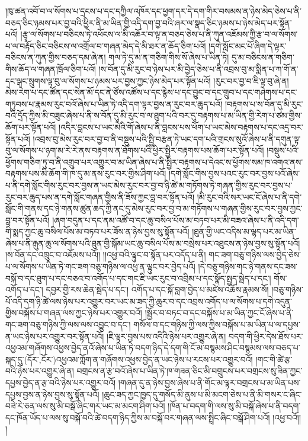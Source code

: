 །ཁུ་ཚན་འབོ་བ་ལ་སོགས་པ་དྲངས་པ་དང་དཀྱིལ་འཁོར་དང་ཕྱག་དར་དེ་དག་གིར་བསམས་ན་ཉེས་མེད་ཅེས་པ་ནི་བཅད་ཅིང་ཉམས་པར་བྱ་བའི་ཕྱིར་ནི་མ་ཡིན་གྱི་འདི་དག་བྱ་བའི་ཞར་ལ་སྣད་ཅིང་ཉམས་པ་ཉེས་མེད་པར་སྟོན་པའོ། །རྩྭ་ལ་སོགས་པ་བཅིངས་ཏེ་འཕོངས་ལ་མི་འཆོར་བ་ལྟ་ན་བཅད་ཅེས་པ་ནི་ཀུན་འཇོམས་ཀྱི་རྩ་བ་ལ་སོགས་པ་ལ་བརྟོད་ཅིང་བཅིངས་ལ་འགྲོལ་བ་གཞན་མེད་དེ་མི་ཐར་ན་ཆོད་ཅིག་པའོ། །དགེ་སློང་མང་པོ་ཞིག་དེ་ལྟར་བཅིངས་ན་ཀུན་གྱིས་བཅད་དམ་ཞེ་ན། གལ་ཏེ་དུ་མ་ན་གཅིག་གིས་སོ་ཞེས་པ་ཡིན་ཏེ། དུ་མ་བཅིངས་ན་གཅིག་གིས་ཆོད་ལ་གཞན་ཁྲོལ་ཅིག་པའོ། །ས་བོན་དུ་མི་རུང་བ་ཉེས་པར་མི་བྱེད་ཅེས་པ་ནི་འབྲས་བུ་མ་སྨིན་པ་ཀ་གོ་ན་དང་ལྒང་སྲུགས་ལྟ་བུ་ལ་སོགས་པ་ཉམས་པར་བྱས་ཀྱང་ཉེས་མེད་པར་སྟོན་པའོ། །རུང་བར་བྱ་བ་ཇི་ལྟ་བུ་ཞེ་ན། མེས་རེག་པ་དང་ཚོན་དང་སེན་མོ་དང་ནེ་ཙོས་འཚོས་པ་དང་རྙེས་པ་དང་བྱུང་བ་དང་གྲུབ་པ་དང་གཤེགས་པ་དང་གཏུབས་པ་རྣམས་རུང་བའོ་ཞེས་པ་ཡིན་ཏེ་འདི་དག་ལྟར་བྱས་ན་རུང་བར་ཆུད་པའོ། །བརྟགས་པ་ས་བོན་དུ་མི་རུང་བའི་དྲོད་ཀྱིས་མི་བཟུང་ཞེས་པ་ནི་ས་བོན་དུ་མི་རུང་བ་ལ་ཐུག་པའི་བར་དུ་བརྟགས་པ་མ་ཡིན་གྱི་རེག་པ་ཙམ་གྱིས་ཆོག་པར་སྟོན་པའོ། །འདིར་བླངས་པ་ཡང་མེའི་གོ་ཞེས་པ་ནི་བླངས་པས་ཕོག་པ་ཡང་མེས་བརྟགས་པ་དང་འདྲ་བར་སྟོན་པའོ། །འབྲས་བུ་མེས་རུང་བར་བྱ་བ་ནི་བསྡུས་པའི་སྤྱི་བརྩན་ཏེ་ཡང་དག་པའི་གྲངས་སུའོ་ཞེས་པ་ནི་དགུན་ལྟ་བུ་ལ་སོགས་པ་ཉག་མ་རེ་རེ་ནས་བརྟགས་ན་ཐོགས་པའི་ཕྱིར་སྤྱིར་བརྟགས་པས་ཆོག་པར་སྟོན་པའོ། །བསྡུས་པའི་ཕྱོགས་གཅིག་ཏུ་བ་ནི་འགྲུབ་པར་འགྱུར་བ་མ་ཡིན་ཞེས་པ་ནི་སྤྱིར་བརྟགས་པ་དེའང་ས་ཕྱོགས་སམ་ཁ་འགའ་ནས་བརྟགས་པས་མི་ཆོག་གི་ཁ་དུ་མ་ནས་རུང་བར་གྱིས་ཤིག་པའོ། །དགེ་སློང་གིས་བྱས་པའང་རུང་བར་བྱས་པའོ་ཞེས་པ་ནི་དགེ་སློང་གིས་རུང་བར་བྱས་ན་ཡང་མེས་རུང་བར་བྱ་བ་ཉི་ཚེ་མ་གཏོགས་ཏེ་གཞན་གྱིས་རུང་བར་བྱས་པ་རུང་བར་ཆུད་པས་ན་དགེ་སློང་གཞན་གྱིས་ནི་ཟོས་ཀྱང་བླ་བར་སྟོན་པའོ། །མི་རུང་བའི་སར་ཡང་ངོ་ཞེས་པ་ནི་དགེ་སློང་གི་གནས་དང་ཉེ་གནས་ཚུན་ཆད་ཀྱི་ནང་དུ་མེས་རུང་བར་བྱ་བ་མ་གཏོགས་པ་གཞན་གྱིས་རུང་བར་བྱས་ཀྱང་བླ་བར་སྟོན་པའོ། །ཞག་བདུན་པ་དང་ནམ་འཚོ་བ་དང་ཆུ་བསིལ་པོས་མ་བཏབ་པར་མི་བཟའ་ཞེས་པ་ནི་འདི་དག་གི་སྨད་ཀྱང་ཆུ་བསིལ་པོས་མ་བཏབ་པར་ཟོས་ན་ཉེས་བྱས་སུ་སྟོན་པའོ། །ཐུན་གྱི་ཡང་འདིས་མ་ལྷད་པར་མ་ཡིན་ཞེས་པ་ནི་རྒུན་ཆུ་ལ་སོགས་པའི་ཐུན་གྱི་སྐོམ་ཡང་ཆུ་བསིལ་པོས་མ་བསྲེས་པར་འཐུངས་ན་ཉེས་བྱས་སུ་སྟོན་པའོ། །ས་བོན་དང་འཁྲུང་བ་འཇོམས་པའོ།། །།འཕྱ་བའི་ལྟུང་བ་སྟོན་པར་འདོད་པ་ནི། གང་ཟག་བཅུ་གཉིས་ལས་བྱེད་ཅེས་པ་ལ་སོགས་པ་ཡིན་ཏེ་གང་ཟག་བཅུ་གཉིས་ལ་འཕྱ་ན་ལྟུང་བར་བྱེད་པའོ། །དེ་བཅུ་གཉིས་གང་ཉེ་གནས་དང་ཟས་བསྐོ་བ་དང་ཐུག་པ་དང་བཅའ་བ་འགོད་པ་དང་གང་ཇི་ཡང་རུང་བ་འབྲིམ་པ་དང་སྣོད་སྤྱད་སྦེད་པ་དང་། གོས་འགོད་པ་དང་། དབྱར་གྱི་རས་ཆེན་སྦེད་པ་དང་། འགོད་པ་དང་སྐོ་བླག་བྱེད་པ་མཛེས་འཆོས་རྣམས་སོ། །བཅུ་གཉིས་པོ་འདི་དག་ཉི་ཚེ་ལས་ཉེས་པར་འགྱུར་བར་ཡང་མ་ཟད་ཀྱི་ཆུར་བ་དང་འབྲས་འགོད་པ་ལ་སོགས་པ་དགེ་འདུན་གྱིས་བསྐོས་པ་གཞན་ལས་ཀྱང་ཉེས་པར་འགྱུར་བའོ། །སྦྱོར་བ་བཏང་བ་དང་བསྐོས་པ་མ་ཡིན་ཀྱང་ངོ་ཞེས་པ་ནི་གང་ཟག་བཅུ་གཉིས་ཀྱི་ལས་ལས་འབྱུང་བ་དང་། གསོལ་བ་དང་གཉིས་ཀྱི་ལས་ཀྱིས་བསྐོས་པ་མ་ཡིན་པ་ལ་དཔྱས་ན་ཡང་ཉེས་པར་འགྱུར་བར་སྟོན་པའོ། །ཇི་ལྟར་བྱས་པས་འདིའི་ཉེས་པར་འགྱུར་ཞེ་ན། བདག་གི་ཕྱིར་དེས་ཐོས་པར་འཕྱའམ་གཞོགས་འཕྱས་བྱེད་ནའོ་ཞེས་པ་ཡིན་ཏེ་བདག་ཉིད་དེ་དག་གི་ངོ་མ་བསྙམས་ཤིང་བསྙམས་ལས་བཅད་པ་སྐད་དུ་(དོར་‚ངོར་)འཕྱའམ་ཀློག་ན་གཞོགས་འཕྱས་བྱེད་ན་ཡང་ཉེས་པ་རངས་པར་འགྱུར་བའོ། །གང་གི་ཚེ་རྩ་བའི་ཉེས་པར་འགྱུར་ཞེ་ན། བགྲངས་ན་རྩ་བའོ་ཞེས་པ་ཡིན་ཏེ་ཁ་གཟན་ཅིང་མི་བགྲུངས་པར་བགྲངས་སུ་ཟིན་ཀྱང་དཔྱས་བྱེད་ན་རྩ་བའི་ཉེས་པར་འགྱུར་བའོ། །གཞན་དུ་ན་ཉེས་བྱས་ཞེས་པ་ནི་གོང་མ་ལྟར་བགྲངས་པ་མ་ཡིན་པས་དཔྱས་བྱས་ན་ཉེས་བྱས་སུ་སྟོན་པའོ། །ཆུང་ཟད་ཀྱང་ཁྱད་དུ་གསོད་མི་ནུས་པ་མི་མངག་ཅེས་པ་ནི་མི་གསར་ང་ཞིང་བཟེ་རེ་ཅན་ལས་སུ་མི་བསྒོ་ཞིང་གར་ཡང་མ་མངག་ཤིག་པའོ། །ཁོན་པ་བདག་གི་ལས་སུ་མི་བསྐོ་ཞེས་པ་ནི་བདག་དང་ཁོན་ཡོད་པ་ལས་སུ་བསྐོ་བའི་ཚེ་བདག་ཉིད་ཀྱིས་མ་བསྐོ་བར་གཞན་ལས་སྤྲིང་ཞིང་བསྒོ་ཤིག་པའོ། །འཕྱ་བའོ།། །
